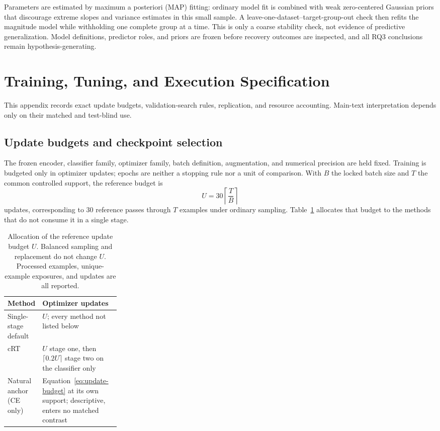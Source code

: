 \documentclass[11pt]{article}
\begin{document}
Parameters are estimated by maximum a posteriori (MAP) fitting: ordinary model fit is combined with weak zero-centered Gaussian priors that discourage extreme slopes and variance estimates in this small sample. A leave-one-dataset--target-group-out check then refits the magnitude model while withholding one complete group at a time. This is only a coarse stability check, not evidence of predictive generalization. Model definitions, predictor roles, and priors are frozen before recovery outcomes are inspected, and all RQ3 conclusions remain hypothesis-generating.

\section{Training, Tuning, and Execution Specification}
\label{app:training}
This appendix records exact update budgets, validation-search rules, replication, and resource accounting. Main-text interpretation depends only on their matched and test-blind use.

\subsection{Update budgets and checkpoint selection}
The frozen encoder, classifier family, optimizer family, batch definition, augmentation, and numerical precision are held fixed. Training is budgeted only in optimizer updates; epochs are neither a stopping rule nor a unit of comparison. With $B$ the locked batch size and $T$ the common controlled support, the reference budget is
\begin{equation}
  U=30\left\lceil\frac{T}{B}\right\rceil
  \label{eq:update-budget}
\end{equation}
\noindent updates, corresponding to 30 reference passes through $T$ examples under ordinary sampling. Table~\ref{tab:budgets} allocates that budget to the methods that do not consume it in a single stage.

\begin{table}[ht]
  \centering
  \footnotesize
  \begin{tabularx}{\linewidth}{@{}>{\raggedright\arraybackslash}p{0.26\linewidth}X@{}}
    \toprule
    Method & Optimizer updates \\
    \midrule
    Single-stage default & $U$; every method not listed below \\
    cRT & $U$ stage one, then $\lceil0.2U\rceil$ stage two on the classifier only \\
    Natural anchor (CE only) & Equation~\eqref{eq:update-budget} at its own support; descriptive, enters no matched contrast \\
    \bottomrule
  \end{tabularx}
  \caption{Allocation of the reference update budget $U$. Balanced sampling and replacement do not change $U$. Processed examples, unique-example exposures, and updates are all reported.}
  \label{tab:budgets}
\end{table}
\end{document}

